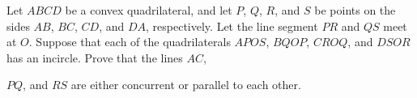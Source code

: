 Let 
$ABCD$
 be a convex quadrilateral, and let 
$P$, 
$Q$, 
$R$,
and 
$S$
 be points on the sides 
$AB$, 
$BC$, 
$CD$, 
 and 
$DA$, 
 respectively. Let the line segment 
$PR$
 and 
$QS$
 meet at 
$O$.
 Suppose that each of the quadrilaterals 
$APOS$, 
$BQOP$, 
$CROQ$, 
 and 
$DSOR$
 has an incircle. Prove that the lines 
$AC$, 
 
$PQ$, 
 and 
$RS$
 are either concurrent or parallel to each other.
